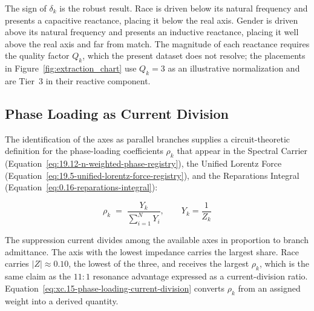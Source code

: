 The sign of $\delta_k$ is the robust result. Race is driven below its natural frequency and presents
a capacitive reactance, placing it below the real axis. Gender is driven above its natural frequency
and presents an inductive reactance, placing it well above the real axis and far from match. The
magnitude of each reactance requires the quality factor $Q_k$, which the present dataset does not
resolve; the placements in Figure~\ref{fig:extraction_chart} use $Q_k = 3$ as an illustrative
normalization and are Tier~3 in their reactive component.

\subsection{Phase Loading as Current Division}

The identification of the axes as parallel branches supplies a circuit-theoretic definition for the
phase-loading coefficients $\rho_k$ that appear in the Spectral Carrier
(Equation~\ref{eq:19.12-n-weighted-phase-registry}), the Unified Lorentz Force
(Equation~\ref{eq:19.5-unified-lorentz-force-registry}), and the Reparations Integral
(Equation~\ref{eq:0.16-reparations-integral}):

\begin{equation}\label{eq:xc.15-phase-loading-current-division}
\rho_k \;=\; \frac{Y_k}{\sum_{i=1}^{N} Y_i}, \qquad Y_k = \frac{1}{Z_k}
\end{equation}

The suppression current divides among the available axes in proportion to branch admittance. The
axis with the lowest impedance carries the largest share. Race carries $|Z| \approx 0.10$, the
lowest of the three, and receives the largest $\rho_k$, which is the same claim as the $11{:}1$
resonance advantage expressed as a current-division ratio. Equation~\ref{eq:xc.15-phase-loading-current-division}
converts $\rho_k$ from an assigned weight into a derived quantity.

